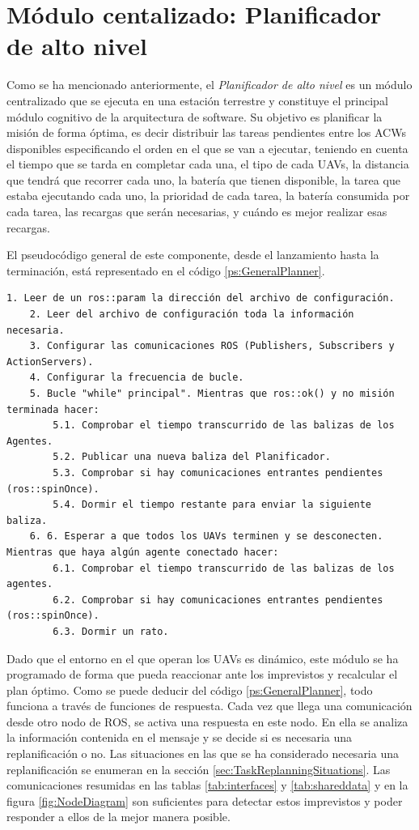 \documentclass[fontsize=11pt, English=false, Español=true, Myfinal=true, twoside, numbers=noenddot]{scrbook}
\begin{document}
\section{Módulo centalizado: Planificador de alto nivel}
\label{sec:Centralised module:TaskPlanner}
Como se ha mencionado anteriormente, el \emph{Planificador de alto nivel} es un módulo centralizado que se ejecuta en una estación terrestre y constituye el principal módulo cognitivo de la arquitectura de software. Su objetivo es planificar la misión de forma óptima, es decir distribuir las tareas pendientes entre los \glspl{ACW} disponibles especificando el orden en el que se van a ejecutar, teniendo en cuenta el tiempo que se tarda en completar cada una, el tipo de cada \glspl{UAV}, la distancia que tendrá que recorrer cada uno, la batería que tienen disponible, la tarea que estaba ejecutando cada uno, la prioridad de cada tarea, la batería consumida por cada tarea, las recargas que serán necesarias, y cuándo es mejor realizar esas recargas.

El pseudocódigo general de este componente, desde el lanzamiento hasta la terminación, está representado en el código \ref{ps:GeneralPlanner}.

\begin{lstlisting}[caption={General operation of \emph{High-Level Planner}'s code}, breaklines=true, label=ps:GeneralPlanner]
  1. Leer de un ros::param la dirección del archivo de configuración.
	2. Leer del archivo de configuración toda la información necesaria.
	3. Configurar las comunicaciones ROS (Publishers, Subscribers y ActionServers).
	4. Configurar la frecuencia de bucle.
	5. Bucle "while" principal". Mientras que ros::ok() y no misión terminada hacer:
		5.1. Comprobar el tiempo transcurrido de las balizas de los Agentes.
		5.2. Publicar una nueva baliza del Planificador.
		5.3. Comprobar si hay comunicaciones entrantes pendientes (ros::spinOnce).
		5.4. Dormir el tiempo restante para enviar la siguiente baliza.
	6. 6. Esperar a que todos los UAVs terminen y se desconecten. Mientras que haya algún agente conectado hacer:
		6.1. Comprobar el tiempo transcurrido de las balizas de los agentes.
		6.2. Comprobar si hay comunicaciones entrantes pendientes (ros::spinOnce).
		6.3. Dormir un rato.
\end{lstlisting}

Dado que el entorno en el que operan los \glspl{UAV} es dinámico, este módulo se ha programado de forma que pueda reaccionar ante los imprevistos y recalcular el plan óptimo. Como se puede deducir del código \ref{ps:GeneralPlanner}, todo funciona a través de funciones de respuesta. Cada vez que llega una comunicación desde otro nodo de \acrshort{ROS}, se activa una respuesta en este nodo. En ella se analiza la información contenida en el mensaje y se decide si es necesaria una replanificación o no. Las situaciones en las que se ha considerado necesaria una replanificación se enumeran en la sección \ref{sec:TaskReplanningSituations}. Las comunicaciones resumidas en las tablas \ref{tab:interfaces} y \ref{tab:shareddata} y en la figura \ref{fig:NodeDiagram} son suficientes para detectar estos imprevistos y poder responder a ellos de la mejor manera posible.
\end{document}
